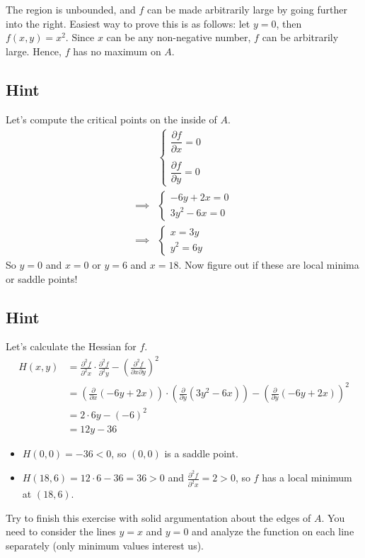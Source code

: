 \documentclass[a4paper,10pt]{article}
\begin{document}
The region is unbounded, and $f$ can be made arbitrarily large by going further into the right. Easiest way to prove this is as follows: let $y=0$, then $f(x,y) = x^2$. Since $x$ can be any non-negative number, $f$ can be arbitrarily large. Hence, $f$ has no maximum on $A$.

\subsection{Hint}
Let's compute the critical points on the inside of $A$.
\begin{align*}
             & \begin{cases}
                   \dfrac{\partial f}{\partial x} = 0 \\ \\
                   \dfrac{\partial f}{\partial y} = 0
               \end{cases} \\
    \implies & \begin{cases}
                   -6y + 2x = 0 \\
                   3y^2 - 6x = 0
               \end{cases}                          \\
    \implies & \begin{cases}
                   x = 3y \\
                   y^2 = 6y
               \end{cases}
\end{align*}
So $y=0$ and $x=0$ or $y=6$ and $x=18$. Now figure out if these are local minima or saddle points!

\subsection{Hint}
Let's calculate the Hessian for $f$.
\begin{align*}
    H(x,y) & = \frac{\partial^2 f}{\partial^2 x}\cdot \frac{\partial^2 f}{\partial^2 y} - \left(\frac{\partial^2 f}{\partial x\partial y}\right)^2 \\
           & = \left(\frac{\partial}{\partial x}(-6y + 2x)\right) \cdot \left(\frac{\partial}{\partial y}(3y^2 - 6x)\right) - \left(\frac{\partial}{\partial y}(-6y + 2x)\right)^2 \\
           & = 2 \cdot 6y - (-6)^2 \\
           & = 12y - 36
\end{align*}
\begin{itemize}
    \item $H(0,0) = -36 < 0$, so $(0,0)$ is a saddle point.
    \item $H(18,6) = 12\cdot 6 - 36 = 36 > 0$ and $\frac{\partial^2 f}{\partial^2 x} = 2 > 0$, so $f$ has a local minimum at $(18, 6)$.
\end{itemize}
Try to finish this exercise with solid argumentation about the edges of $A$. You need to consider the lines $y=x$ and $y=0$ and analyze the function on each line separately (only minimum values interest us).
\end{document}
